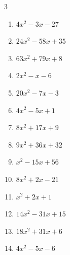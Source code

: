\begin{multicols}{3}
\begin{enumerate}
\columnbreak %

  \item $4x^{2}-3x-27$

        \phantom{$=(4x+9)(x-3)$}

  \item $24x^{2}-58x+35$

        \phantom{$=(6x-7)(4x-5)$}

  \item $63x^{2}+79x+8$

        \phantom{$=(9x+1)(7x+8)$}

  \item $2x^{2}-x-6$

        \phantom{$=(x-2)(2x+3)$}

  \item $20x^{2}-7x-3$

        \phantom{$=(5x-3)(4x+1)$}

  \item $4x^{2}-5x+1$

        \phantom{$=(x-1)(4x-1)$}

  \item $8x^{2}+17x+9$

        \phantom{$=(x+1)(8x+9)$}

  \item $9x^{2}+36x+32$

        \phantom{$=(3x+4)(3x+8)$}

  \item $x^{2}-15x+56$

        \phantom{$=(x-8)(x-7)$}

  \item $8x^{2}+2x-21$

        \phantom{$=(4x+7)(2x-3)$}

\columnbreak %

\resetques

  \item $x^{2}+2x+1$


  \item $14x^{2}-31x+15$

        \phantom{$=(7x-5)(2x-3)$}

  \item $18x^{2}+31x+6$

        \phantom{$=(2x+3)(9x+2)$}

  \item $4x^{2}-5x-6$

        \phantom{$=(x-2)(4x+3)$}


\end{enumerate}
\end{multicols}
